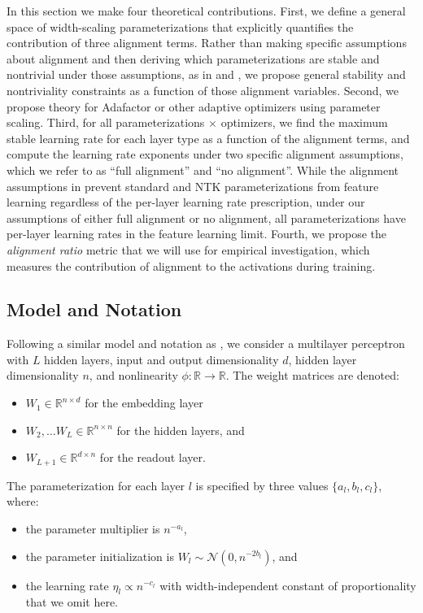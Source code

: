 \documentclass{article}
\theoremstyle{plain}
\theoremstyle{definition}
\theoremstyle{remark}
\newcommand{\R}{\mathbb{R}}
\begin{document}
In this section we make four theoretical contributions. First, we define a general space of width-scaling parameterizations that explicitly quantifies the contribution of three alignment terms. Rather than making specific assumptions about alignment and then deriving which parameterizations are stable and nontrivial under those assumptions, as in \citet{yang2021tensoriv} and \citet{yang2023tensorivb}, we propose general stability and nontriviality constraints as a function of those alignment variables. Second, we propose theory for Adafactor or other adaptive optimizers using parameter scaling. Third, for all parameterizations $\times$ optimizers, we find the maximum stable learning rate for each layer type as a function of the alignment terms, and compute the learning rate exponents under two specific alignment assumptions, which we refer to as ``full alignment'' and ``no alignment''. While the alignment assumptions in \citet{yang2021tensoriv} prevent standard and NTK parameterizations from feature learning regardless of the per-layer learning rate prescription, under our assumptions of either full alignment or no alignment, all parameterizations have per-layer learning rates in the feature learning limit. Fourth, we propose the \emph{alignment ratio} metric that we will use for empirical investigation, which measures the contribution of alignment to the activations during training.


\subsection{Model and Notation}
Following a similar model and notation as \citet{yang2021tensoriv}, we consider a multilayer perceptron with $L$ hidden layers, input and output dimensionality $d$, hidden layer dimensionality $n$, and nonlinearity $\phi: \R \rightarrow \R$. The weight matrices are denoted:
\begin{itemize}
    \item $W_1 \in \R^{n \times d}$ for the embedding layer
    \item $W_2, \ldots W_L \in \R ^ {n \times n}$ for the hidden layers, and
    \item $W_{L+1} \in \R^{d \times n}$ for the readout layer.
\end{itemize}

The parameterization for each layer $l$ is specified by three values $\{a_l, b_l, c_l\}$, where:
\begin{itemize}
    \item the parameter multiplier is $n^{-a_l}$,
    \item the parameter initialization is $W_l \sim \mathcal{N}(0, n^{-2b_l})$, and
    \item  the learning rate $\eta_l \propto n^{-c_l}$ with width-independent constant of proportionality that we omit here.
\end{itemize}
\end{document}
